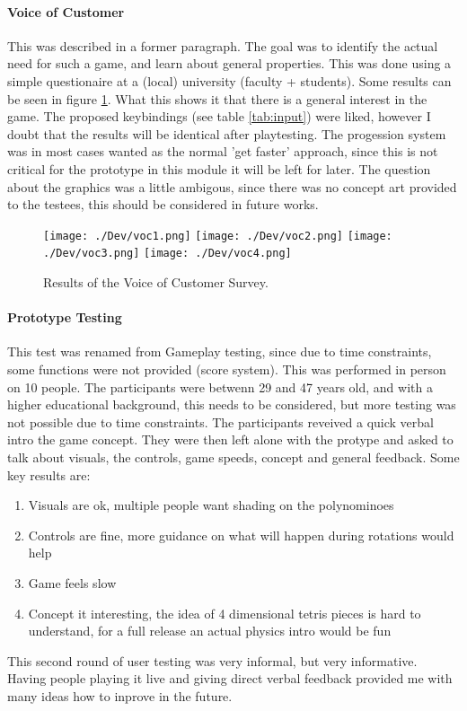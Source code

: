 \documentclass{article}
\begin{document}
\paragraph{Voice of Customer}
This was described in a former paragraph. The goal was to identify the actual need for such a game, and learn about general properties. This was done using a simple questionaire at a (local) university (faculty + students).
Some results can be seen in figure \ref{fig:voc}. What this shows it that there is a general interest in the game. The proposed keybindings (see table \ref{tab:input}) were liked, however I doubt that the results will be identical after playtesting.
The progession system was in most cases wanted as the normal 'get faster' approach, since this is not critical for the prototype in this module it will be left for later.
The question about the graphics was a little ambigous, since there was no concept art provided to the testees, this should be considered in future works.
\begin{figure}
    \centering
    \texttt{[image: ./Dev/voc1.png]}
    \texttt{[image: ./Dev/voc2.png]}
    \texttt{[image: ./Dev/voc3.png]}
    \texttt{[image: ./Dev/voc4.png]}
    \caption{Results of the Voice of Customer Survey.}
    \label{fig:voc}
\end{figure}
\paragraph{Prototype Testing}
This test was renamed from Gameplay testing, since due to time constraints, some functions were not provided (score system).
This was performed in person on 10 people. The participants were betwenn 29 and 47 years old, and with a higher educational background, this needs to be considered, but more testing was not possible due to time constraints.\newline
The participants reveived a quick verbal intro the game concept. They were then left alone with the protype and asked to talk about visuals, the controls, game speeds, concept and general feedback.
Some key results are:
\begin{enumerate}
    \item Visuals are ok, multiple people want shading on the polynominoes
    \item Controls are fine, more guidance on what will happen during rotations would help
    \item Game feels slow
    \item Concept it interesting, the idea of 4 dimensional tetris pieces is hard to understand, for a full release an actual physics intro would be fun
\end{enumerate}
This second round of user testing was very informal, but very informative. Having people playing it live and giving direct verbal feedback provided me with many ideas how to inprove in the future.
\end{document}
